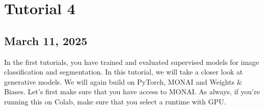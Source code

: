 \documentclass[letterpaper,10pt,english]{jupyterBook}
\begin{document}
\chapter{Tutorial 4}
\label{\detokenize{notebooks/Tutorial4_Generative_Models/Tutorial4_Generative_Models_student:tutorial-4}}\label{\detokenize{notebooks/Tutorial4_Generative_Models/Tutorial4_Generative_Models_student::doc}}

\section{March 11, 2025}
\label{\detokenize{notebooks/Tutorial4_Generative_Models/Tutorial4_Generative_Models_student:march-11-2025}}
\sphinxAtStartPar
In the first tutorials, you have trained and evaluated supervised models for image classification and segmentation. In this tutorial, we will take a closer look at generative models. We will again build on PyTorch, MONAI and Weights \& Biases. Let’s first make sure that you have access to MONAI. As always, if you’re running this on Colab, make sure that you select a runtime with GPU.
\end{document}
